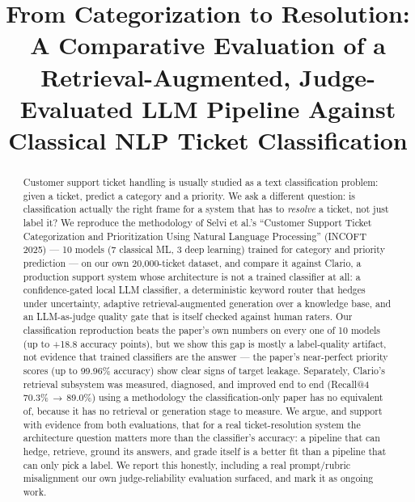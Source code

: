 \documentclass[conference]{IEEEtran}
\begin{document}
\title{From Categorization to Resolution: A Comparative Evaluation of a Retrieval-Augmented, Judge-Evaluated LLM Pipeline Against Classical NLP Ticket Classification}

\author{
\and
{}
}

\maketitle

\begin{abstract}
Customer support ticket handling is usually studied as a text classification problem: given a ticket, predict a category and a priority. We ask a different question: is classification actually the right frame for a system that has to \emph{resolve} a ticket, not just label it? We reproduce the methodology of Selvi et al.'s ``Customer Support Ticket Categorization and Prioritization Using Natural Language Processing'' (INCOFT 2025) --- 10 models (7 classical ML, 3 deep learning) trained for category and priority prediction --- on our own 20,000-ticket dataset, and compare it against Clario, a production support system whose architecture is not a trained classifier at all: a confidence-gated local LLM classifier, a deterministic keyword router that hedges under uncertainty, adaptive retrieval-augmented generation over a knowledge base, and an LLM-as-judge quality gate that is itself checked against human raters. Our classification reproduction beats the paper's own numbers on every one of 10 models (up to +18.8 accuracy points), but we show this gap is mostly a label-quality artifact, not evidence that trained classifiers are the answer --- the paper's near-perfect priority scores (up to 99.96\% accuracy) show clear signs of target leakage. Separately, Clario's retrieval subsystem was measured, diagnosed, and improved end to end (Recall@4 70.3\%\,$\rightarrow$\,89.0\%) using a methodology the classification-only paper has no equivalent of, because it has no retrieval or generation stage to measure. We argue, and support with evidence from both evaluations, that for a real ticket-resolution system the architecture question matters more than the classifier's accuracy: a pipeline that can hedge, retrieve, ground its answers, and grade itself is a better fit than a pipeline that can only pick a label. We report this honestly, including a real prompt/rubric misalignment our own judge-reliability evaluation surfaced, and mark it as ongoing work.
\end{abstract}
\end{document}
